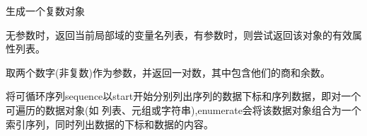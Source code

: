 \noindent{\color{red}{complex([real[,imag]]):}}
\par{生成一个复数对象}\\

\noindent{\color{red}{dir([object]):}}
\par{无参数时，返回当前局部域的变量名列表，有参数时，则尝试返回该对象的有效属性列表。}\\

\noindent{\color{red}{divmod(a, b):}}
\par{取两个数字(非复数)作为参数，并返回一对数，其中包含他们的商和余数。}\\

\noindent{\color{red}{enumerate(sequence, [start=0]):}}
\par{将可循环序列sequence以start开始分别列出序列的数据下标和序列数据，即对一个可遍历的数据对象(如
列表、元组或字符串),enumerate会将该数据对象组合为一个索引序列，同时列出数据的下标和数据的内容。}\\






